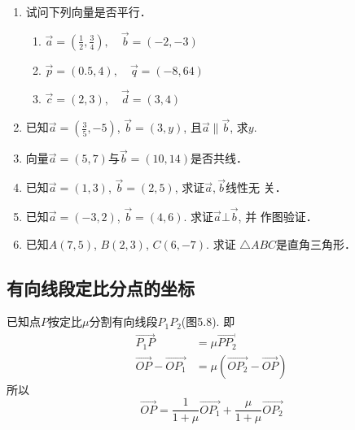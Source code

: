 \begin{ex}
\begin{enumerate}
    \item 试问下列向量是否平行．
    \begin{enumerate}
    \item $\vec{a}=\left(\frac{1}{2},\frac{3}{4}\right),\quad \vec{b}=(-2,-3)$
    \item $\vec{p}=(0.5,4),\quad \vec{q}=(-8,64)$
    \item $\vec{c}=(2,3),\quad \vec{d}=(3,4)$
\end{enumerate}

\item 已知$\vec{a}=\left(\frac{3}{5},-5\right)$, $\vec{b}=(3,y)$, 且$\vec{a}\parallel \vec{b}$, 求$y$.

\item 向量$\vec{a}=(5,7)$与$\vec{b}=(10,14)$是否共线．

\item 已知$\vec{a}=(1,3)$, $\vec{b}=(2,5)$, 求证$\vec{a},\vec{b}$线性无
关．

\item 已知$\vec{a}=(-3,2)$, $\vec{b}=(4,6)$. 求证$\vec{a}\bot \vec{b}$, 并
作图验证．

\item 已知$A(7,5)$, $B(2,3)$, $C(6,-7)$. 求证
$\triangle ABC$是直角三角形．
\end{enumerate}
\end{ex}

\subsection{有向线段定比分点的坐标}
已知点$P$按定比$\mu$分割有向线段$P_1P_2$(图5.8). 
即
\[\begin{split}
     \Vec{P_1P}&=\mu \Vec{PP_2}\\
     \Vec{OP}-\Vec{OP_1}&=\mu\left(\Vec{OP_2}-\Vec{OP}\right)
\end{split}\]
所以
\[\Vec{OP}=\frac{1}{1+\mu}\Vec{OP_1}+\frac{\mu}{1+\mu}\Vec{OP_2}\]

\begin{figure}[htp]
    \centering
{}
    \caption{}
\end{figure}


